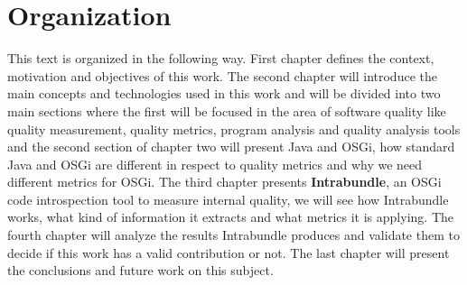  
\section{Organization}

This text is organized in the following way. First chapter defines the context, motivation and objectives of this work. The second chapter will introduce the main concepts and technologies used in this work and will be divided into two main sections where the first will be focused in the area of software quality like quality measurement, quality metrics, program analysis and quality analysis tools and the second section of chapter two will present Java and OSGi, how standard Java and OSGi are different in respect to quality metrics and why we need different metrics for OSGi. The third chapter presents \textbf{Intrabundle}, an OSGi code introspection tool to measure internal quality, we will see how Intrabundle works, what kind of information it extracts and what metrics it is applying. The fourth chapter will analyze the results Intrabundle produces and validate them to decide if this work has a valid contribution or not. The last chapter will present the conclusions and future work on this subject.